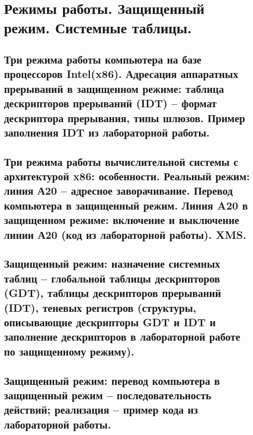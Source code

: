 \section{Режимы работы. Защищенный режим. Системные таблицы.}

\subsection{Три режима работы компьютера на базе процессоров Intel(x86). Адресация аппаратных прерываний в защищенном режиме: таблица дескрипторов прерываний (IDT) – формат дескриптора прерывания, типы шлюзов. Пример заполнения IDT из лабораторной работы.}

\newpage

\subsection{Три режима работы вычислительной системы с архитектурой x86: особенности. Реальный режим: линия А20 – адресное заворачивание. Перевод компьютера в защищенный режим. Линия A20 в защищенном режиме: включение и выключение линии А20 (код из лабораторной работы). XMS.}

\newpage

\subsection{Защищенный режим: назначение системных таблиц – глобальной таблицы дескрипторов (GDT), таблицы дескрипторов прерываний (IDT), теневых регистров (структуры, описывающие дескрипторы GDT и IDT и заполнение дескрипторов в лабораторной работе по защищенному режиму).}

\newpage

\subsection{Защищенный режим: перевод компьютера в защищенный режим – последовательность действий; реализация – пример кода из лабораторной работы.}
